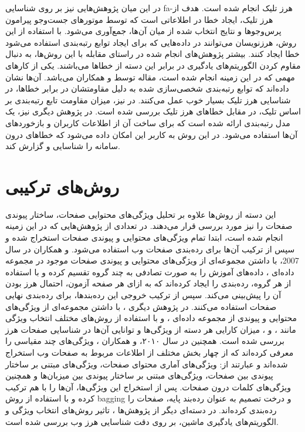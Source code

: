 \documentclass[twoside, a4paper,11pt]{book}
\numberwithin{equation}{chapter}
\numberwithin{table}{chapter}
\numberwithin{figure}{chapter}
\numberwithin{equation}{chapter}
\newcommand{\mls}[1]{\gls{fa-#1}\glsuseri{la-#1}}
\begin{document}
در این میان پژوهش‌هایی نیز بر روی شناسایی \mls{هرز تلیک} انجام شده است. هدف از هرز تلیک، ایجاد خطا در اطلاعاتی است که توسط موتورهای جست‌و‌جو  پیرامون پرس‌وجو‌ها و نتایج انتخاب شده از میان آن‌ها، جمع‌آوری می‌شود. با استفاده از این روش، هرزنویسان می‌توانند در داده‌‌هایی که برای ایجاد توابع رتبه‌بندی استفاده می‌شود خطا ایجاد کنند. بیشتر پژوهش‌های انجام شده در راستای مقابله با این روش‌ها، به دنبال مقاوم کردن الگوریتم‌های یادگیری در برابر این دسته از خطاها می‌باشند. یکی از کارهای مهمی که در این زمینه انجام شده است، مقاله  \cite{radlinski2007addressing} توسط  و همکاران  می‌باشد. آن‌ها نشان داده‌اند که توابع رتبه‌بندی شخصی‌سازی شده به دلیل مقاومتشان در برابر خطاها، در شناسایی هرز تلیک بسیار خوب عمل می‌کنند. در \cite{dou2008click} نیز، میزان مقاومت تابع رتبه‌بندی بر اساس تلیک، در مقابل خطاهای هرز تلیک بررسی شده است. در پژوهش دیگری \cite{bhattacharjee2007algorithms} نیز، یک مدل رتبه‌بندی ارائه شده است که برای ساخت آن از اطلاعات کاربران و بازخوردهای آن‌ها استفاده می‌شود. در این روش به کاربر این امکان داده می‌شود که خطاهای درون سامانه را شناسایی و گزارش کند. 

\section{روش‌های ترکیبی }
\label{section:relatedwork-combined}
این دسته از روش‌ها علاوه بر تحلیل ویژگی‌های محتوایی صفحات، ساختار پیوندی صفحات را نیز مورد بررسی قرار می‌دهند. در تعدادی از پژوهش‌هایی \cite{geng2007boosting, mahmoudi2010web, geng2013evaluating, wahsheh2013link} که در این زمینه انجام شده است، ابتدا تمام ویژگی‌های محتوایی و پیوندی صفحات استخراج شده و سپس از ترکیب آن‌ها برای رده‌بندی صفحات وب استفاده می‌شود.  و همکاران \cite{geng2007boosting} در سال 2007، با داشتن مجموعه‌ای از ویژگی‌های محتوایی و پیوندی صفحات موجود در مجموعه داده‌ای ، داده‌های آموزش را به صورت تصادفی به چند گروه تقسیم کرده و با استفاده از هر گروه، رده‌بندی را ایجاد کرده‌اند که به ازای هر صفحه آزمون، احتمال هرز بودن آن را پیش‌بینی می‌کند. سپس از ترکیب خروجی این رده‌بندها، برای رده‌بندی نهایی صفحات استفاده می‌کنند. در پژوهش دیگری \cite{mahmoudi2010web}، با داشتن مجموعه‌ای از ویژگی‌های محتوایی و پیوندی از مجموعه داده‌ای ، و با استفاده از روش‌های مختلف انتخاب ویژگی مانند ،  \cite{liu1995chi2}  و   \cite{Hall:2000:CFS:645529.657793}، میزان کارایی هر دسته از ویژگی‌ها و توانایی آن‌ها در شناسایی صفحات هرز بررسی شده است. همچنین در سال ۲۰۱۰،  و همکاران \cite{geng2013evaluating}، ویژگی‌های چند مقیاسی را معرفی کرده‌اند که از چهار بخش مختلف از اطلاعات مربوط به صفحات وب استخراج شده‌اند و عبارتند از: ویژگی‌های آماری محتوای صفحات، ویژگی‌های مبتنی بر ساختار پیوندی بین صفحات، ویژگی‌های مبتنی بر ساختار پیوندی بین میزبان‌ها و همچنین ویژگی‌های  کلمات درون صفحات. پس از استخراج این ویژگی‌ها، آن‌ها را با هم ترکیب کرده و با استفاده از روش bagging و درخت تصمیم  به عنوان رده‌بند پایه، صفحات را رده‌بندی کرده‌اند.  در دسته‌ای دیگر از پژوهش‌ها \cite{jia2012research, goh2013multilayer, Erdelyi:2011wsc}، تاثیر روش‌های انتخاب ویژگی و الگوریتم‌های یادگیری ماشین، بر روی دقت شناسایی هرز وب بررسی شده است.
\end{document}
